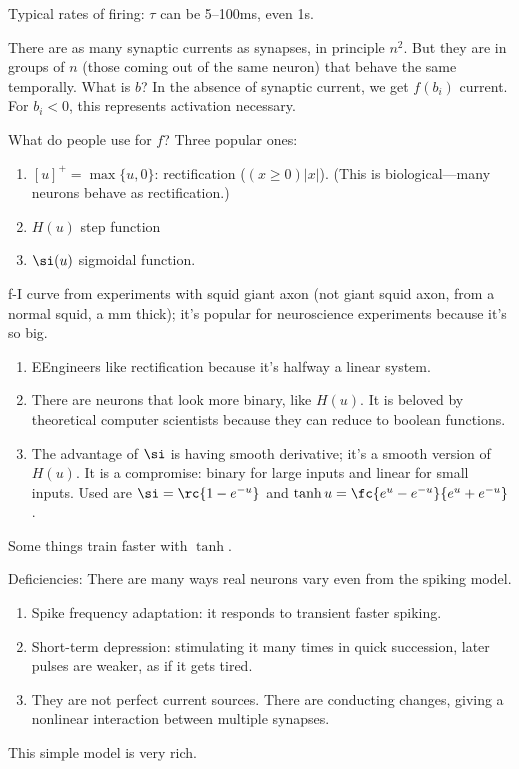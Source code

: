 Typical rates of firing: $\tau$ can be 5--100ms, even 1s.

There are as many synaptic currents as synapses, in principle $n^2$. But they are in groups of $n$ (those coming out of the same neuron) that behave the same temporally. What is $b$? In the absence of synaptic current, we get $f(b_i)$ current. For $b_i<0$, this represents activation necessary.

What do people use for $f$? Three popular ones:
\begin{enumerate}
\item
$[u]^+=\max\{u,0\}$: rectification ($(x\ge0)|x|$). (This is biological---many neurons behave as rectification.)
\item $H(u)$ step function
\item $\si(u)$ sigmoidal function.
\end{enumerate}



f-I curve from experiments with squid giant axon (not giant squid axon, from a normal squid, a mm thick); it's popular for neuroscience experiments because it's so big.

\begin{enumerate}
\item EEngineers like rectification because it's halfway a linear system. %
\item
There are neurons that look more binary, like $H(u)$. It is beloved by theoretical computer scientists because they can reduce to boolean functions. 
\item
The advantage of $\si$ is having smooth derivative; it's a smooth version of $H(u)$. It is a compromise: binary for large inputs and linear for small inputs. Used are $\si=\rc{1-e^{-u}}$ and $\tanh u  =\fc{e^u-e^{-u}}{e^u+e^{-u}}$.
\end{enumerate}
Some things train faster with $\tanh$.

Deficiencies: There are many ways real neurons vary even from the spiking model.
\begin{enumerate}
\item Spike frequency adaptation: it responds to transient faster spiking.
\item Short-term depression: stimulating it many times in quick succession, later pulses are weaker, as if it gets tired.
\item
They are not perfect current sources. There are conducting changes, giving a nonlinear interaction between multiple synapses.
\end{enumerate}
This simple model is very rich.


